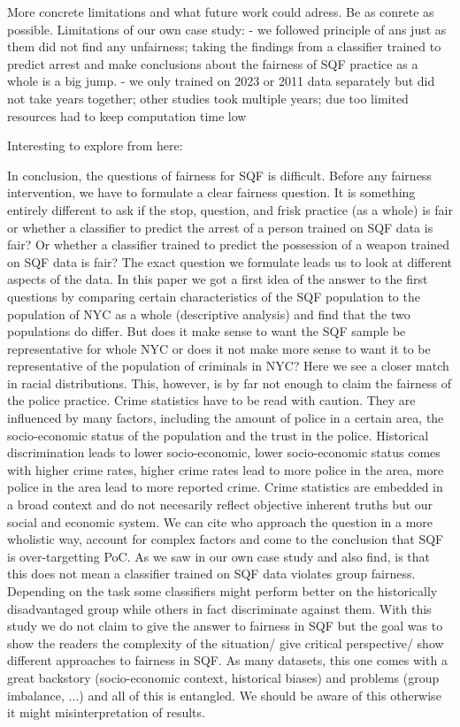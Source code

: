 
More concrete limitations and what future work could adress. Be as conrete as possible.
Limitations of our own case study:
- we followed principle of \cite{Badr2022DTFANSP} ans just as them did not find any unfairness; taking the findings from a classifier trained to predict arrest and make conclusions about the fairness of SQF practice as a whole is a big jump.
- we only trained on 2023 or 2011 data separately but did not take years together; other studies took multiple years; due too limited resources had to keep computation time low

Interesting to explore from here:


In conclusion, the questions of fairness for SQF is difficult.
Before any fairness intervention, we have to formulate a clear fairness question. It is something entirely different to ask if the stop, question, and frisk practice (as a whole) is fair or whether a classifier to predict the arrest of a person trained on SQF data is fair? Or whether a classifier trained to predict the possession of a weapon trained on SQF data is fair?
The exact question we formulate leads us to look at different aspects of the data. In this paper we got a first idea of the answer to the first questions by comparing certain characteristics of the SQF population to the population of NYC as a whole (descriptive analysis) and find that the two populations do differ. But does it make sense to want the SQF sample be representative for whole NYC or does it not make more sense to want it to be representative of the population of criminals in NYC?
Here we see a closer match in racial distributions. This, however, is by far not enough to claim the fairness of the police practice. Crime statistics have to be read with caution. They are influenced by many factors, including the amount of police in a certain area, the socio-economic status of the population and the trust in the police. Historical discrimination leads to lower socio-economic, lower socio-economic status comes with higher crime rates, higher crime rates lead to more police in the area, more police in the area lead to more reported crime. Crime statistics are embedded in a broad context and do not necesarily reflect objective inherent truths but our social and economic system.
We can cite \cite{goel2016} who approach the question in a more wholistic way, account for complex factors and come to the conclusion that SQF is over-targetting PoC.
As we saw in our own case study and \cite{Badr2022DTFANSP} also find, is that this does not mean a classifier trained on SQF data violates group fairness. Depending on the task some classifiers might perform better on the historically disadvantaged group while others in fact discriminate against them.
With this study we do not claim to give the answer to fairness in SQF but the goal was to show the readers the complexity of the situation/ give critical perspective/ show different approaches to fairness in SQF. As many datasets, this one comes with a great backstory (socio-economic context, historical biases) and problems (group imbalance, ...) and all of this is entangled. We should be aware of this otherwise it might misinterpretation of results.


